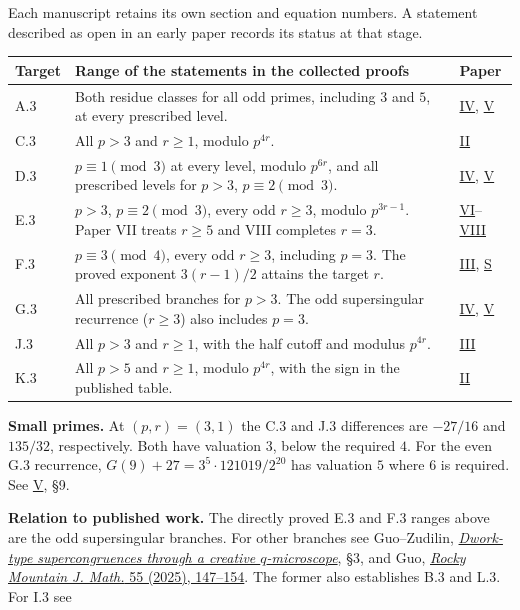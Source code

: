 \documentclass[11pt,letterpaper]{article}
\numberwithin{equation}{section}
\newcommand{\vol}[1]{\hyperref[paper-#1]{#1}}
\begin{document}
Each manuscript retains its own section and equation numbers. A statement
described as open in an early paper records its status at that stage.
\par\medskip
{\small\renewcommand{\arraystretch}{1.2}\noindent
\begin{tabular}{@{}p{.07\linewidth}p{.70\linewidth}p{.14\linewidth}@{}}\toprule
\textbf{Target}&\textbf{Range of the statements in the collected proofs}&\textbf{Paper}\\\midrule
A.3 & Both residue classes for all odd primes, including $3$ and $5$, at every prescribed level. & \vol{IV}, \vol{V}\\
C.3 & All $p>3$ and $r\ge1$, modulo $p^{4r}$. & \vol{II}\\
D.3 & $p\equiv1\pmod3$ at every level, modulo $p^{6r}$, and all prescribed levels for $p>3$, $p\equiv2\pmod3$. & \vol{IV}, \vol{V}\\
E.3 & $p>3$, $p\equiv2\pmod3$, every odd $r\ge3$, modulo $p^{3r-1}$. Paper VII treats $r\ge5$ and VIII completes $r=3$. & \vol{VI}--\vol{VIII}\\
F.3 & $p\equiv3\pmod4$, every odd $r\ge3$, including $p=3$. The proved exponent $3(r-1)/2$ attains the target $r$. & \vol{III}, \vol{S}\\
G.3 & All prescribed branches for $p>3$. The odd supersingular recurrence ($r\ge3$) also includes $p=3$. & \vol{IV}, \vol{V}\\
J.3 & All $p>3$ and $r\ge1$, with the half cutoff and modulus $p^{4r}$. & \vol{III}\\
K.3 & All $p>5$ and $r\ge1$, modulo $p^{4r}$, with the sign in the published table. & \vol{II}\\\bottomrule
\end{tabular}\par}
\medskip
\noindent\textbf{Small primes.} At $(p,r)=(3,1)$ the C.3 and J.3 differences are
$-27/16$ and $135/32$, respectively. Both have valuation $3$, below the required
$4$. For the even G.3 recurrence, $G(9)+27=3^5\cdot121019/2^{20}$ has
valuation $5$ where $6$ is required. See \vol{V}, \S9.
\par\medskip
\noindent\textbf{Relation to published work.} The directly proved E.3 and F.3
ranges above are the odd supersingular branches. For other branches see
Guo--Zudilin, \href{https://arxiv.org/abs/2001.02311}{\emph{Dwork-type supercongruences
through a creative $q$-microscope}}, \S3, and
Guo, \href{https://doi.org/10.1216/rmj.2025.55.147}{\emph{Rocky Mountain J. Math.}
55 (2025), 147--154}. The former also establishes B.3 and L.3. For I.3 see
\end{document}
